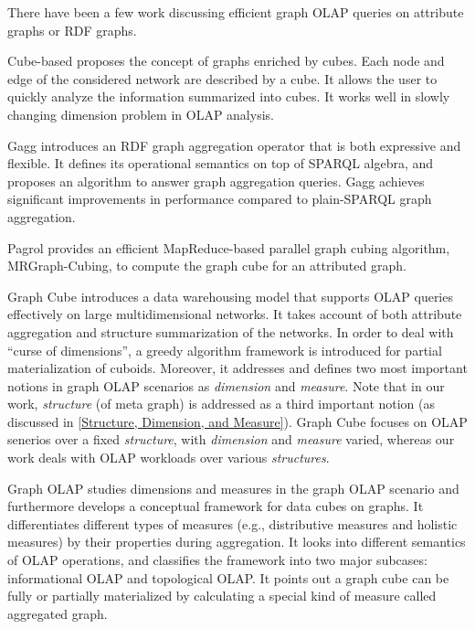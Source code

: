 There have been a few work discussing efficient graph OLAP queries on attribute graphs or RDF graphs.

Cube-based \cite{DBLP:conf/sofsem/JakawatFL16} proposes the concept of  graphs enriched by cubes. Each node and edge of the considered network are described by a cube. It allows the user to quickly analyze the information summarized into cubes. It works well in slowly changing dimension problem in OLAP analysis.

Gagg \cite{iswc15_Maali:2015aa} introduces an RDF graph aggregation operator that is both expressive and flexible. It defines its operational semantics on top of SPARQL algebra, and proposes an algorithm to answer graph aggregation queries. Gagg achieves significant improvements in performance compared to plain-SPARQL graph aggregation.

Pagrol \cite{icde14_Wang:2014aa} provides an efficient MapReduce-based parallel graph cubing algorithm, MRGraph-Cubing, to compute the graph cube for an attributed graph.

Graph Cube \cite{sigmod11_ZhaoLXH11} introduces a data warehousing model that supports OLAP queries effectively on large multidimensional networks. It takes account of both attribute aggregation and structure summarization of the networks. In order to deal with ``curse of dimensions'', a greedy algorithm framework is introduced for partial materialization of cuboids. Moreover, it addresses and defines two most important notions in graph OLAP scenarios as \textit{dimension} and \textit{measure}. Note that in our work, \textit{structure} (of meta graph) is addressed as a third important notion (as discussed in \ref{Structure, Dimension, and Measure}). Graph Cube \cite{sigmod11_ZhaoLXH11} focuses on OLAP senerios over a fixed \textit{structure}, with \textit{dimension} and \textit{measure} varied, whereas our work deals with OLAP workloads over various \textit{structures}. %

Graph OLAP \cite{icdm08_Chen:2008aa} studies dimensions and measures in the graph OLAP scenario and furthermore develops a conceptual framework for data cubes on graphs. It differentiates different types of measures (e.g., distributive measures and holistic measures) by their properties during aggregation. It looks into different semantics of OLAP operations, and classifies the framework into two major subcases: informational OLAP and topological OLAP. It points out a graph cube can be fully or partially materialized by calculating a special kind of measure called aggregated graph.


